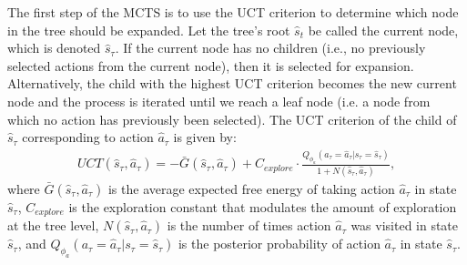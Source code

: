 \documentclass[twoside,11pt]{article}
\begin{document}
The first step of the MCTS is to use the UCT criterion to determine which node in the tree should be expanded. Let the tree's root $\hat{s}_t$ be called the current node, which is denoted $\hat{s}_\tau$. If the current node has no children (i.e., no previously selected actions from the current node), then it is selected for expansion. Alternatively, the child with the highest UCT criterion becomes the new current node and the process is iterated until we reach a leaf node (i.e. a node from which no action has previously been selected). The UCT criterion \citep{MCTS} of the child of $\hat{s}_\tau$ corresponding to action $\hat{a}_\tau$ is given by:
\begin{align*}
UCT(\hat{s}_\tau,\hat{a}_\tau) = - \bar{G}(\hat{s}_\tau,\hat{a}_\tau) + C_{explore} \cdot \frac{Q_{\phi_a}(a_\tau=\hat{a}_\tau|s_\tau=\hat{s}_\tau)}{1 + N(\hat{s}_\tau,\hat{a}_\tau)},
\end{align*}
where $\bar{G}(\hat{s}_\tau,\hat{a}_\tau)$ is the average expected free energy of taking action $\hat{a}_\tau$ in state $\hat{s}_\tau$, $C_{explore}$ is the exploration constant that modulates the amount of exploration at the tree level, $N(\hat{s}_\tau,\hat{a}_\tau)$ is the number of times action $\hat{a}_\tau$ was visited in state $\hat{s}_\tau$, and $Q_{\phi_a}(a_\tau=\hat{a}_\tau|s_\tau=\hat{s}_\tau)$ is the posterior probability of action $\hat{a}_\tau$ in state $\hat{s}_\tau$. 
\end{document}
